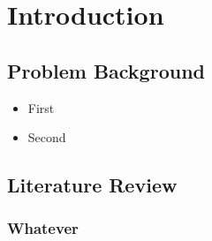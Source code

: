 \section{Introduction}

\subsection{Problem Background}

\begin{itemize}
    \item First
    \item Second
\end{itemize}

\subsection{Literature Review}

\subsubsection{Whatever}